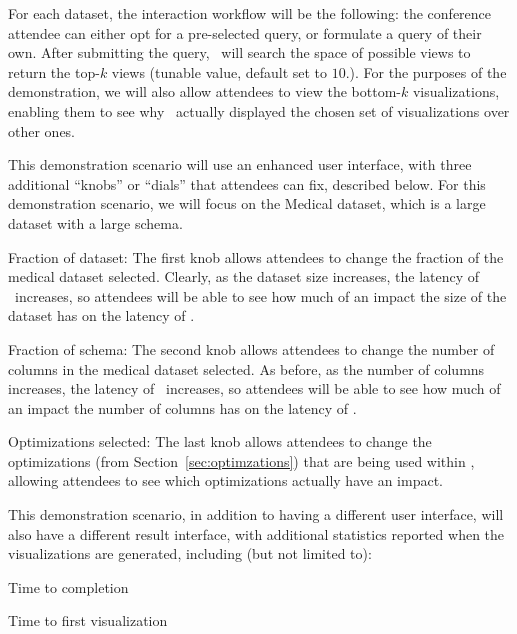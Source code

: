 For each dataset, the interaction workflow will be the following: the conference
attendee can either opt for a pre-selected query, or formulate a query of their
own. After submitting the query, \SeeDB\ will search the space of possible views
to return the top-$k$ views (tunable value, default set to $10$.). For the
purposes of the demonstration, we will also allow attendees to view the
bottom-$k$ visualizations, enabling them to see why \SeeDB\ actually displayed
the chosen set of visualizations over other ones.


 This demonstration
scenario will use an enhanced user interface, with three additional
``knobs'' or ``dials'' that attendees can fix, described below. For
this demonstration scenario, we will focus on the Medical dataset,
which is a large dataset with a large schema.

\squishlist
\item Fraction of dataset: The first knob allows attendees to change
  the fraction of the medical dataset selected. Clearly, as the
  dataset size increases, the latency of \SeeDB\ increases, so
  attendees will be able to see how much of an impact the size of the
  dataset has on the latency of \SeeDB.

\item Fraction of schema: The second knob allows attendees to change
  the number of columns in the medical dataset selected. As before, as
  the number of columns increases, the latency of \SeeDB\ increases,
  so attendees will be able to see how much of an impact the number of
  columns has on the latency of \SeeDB.

\item Optimizations selected: The last knob allows attendees to change
  the optimizations (from Section~\ref{sec:optimzations}) that are
  being used within \SeeDB, allowing attendees to see which
  optimizations actually have an impact.  \squishend

\noindent This demonstration scenario, in addition to having a
different user interface, will also have a different result interface,
with additional statistics reported when the visualizations are
generated, including (but not limited to):

\squishlist
\item Time to completion
\item Time to first visualization
\item {}
\squishend



